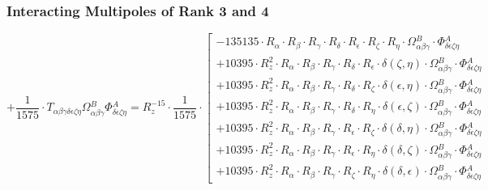 \documentclass{article}
\begin{document}
\subsubsection*{Interacting Multipoles of Rank 3 and 4}
\begin{equation}
+ \frac{1}{1575} \cdot T_{\alpha{}\beta{}\gamma{}\delta{}\epsilon{}\zeta{}\eta{}} \Omega{}^{B}_{\alpha{}\beta{}\gamma{}} \Phi{}^{A}_{\delta{}\epsilon{}\zeta{}\eta{}} = R_{z}^{-15} \cdot \frac{1}{1575} \cdot  \left[ \begin{array}{c} 
 		- 135135 \cdot R_{\alpha{}} \cdot R_{\beta{}} \cdot R_{\gamma{}} \cdot R_{\delta{}} \cdot R_{\epsilon{}} \cdot R_{\zeta{}} \cdot R_{\eta{}} \cdot \Omega{}^{B}_{\alpha{}\beta{}\gamma{}} \cdot \Phi{}^{A}_{\delta{}\epsilon{}\zeta{}\eta{}} 
 \\[0.2em] 		 + 10395 \cdot R_{z}^{2} \cdot R_{\alpha{}} \cdot R_{\beta{}} \cdot R_{\gamma{}} \cdot R_{\delta{}} \cdot R_{\epsilon{}} \cdot \delta{}\left(\zeta{}, \eta{}\right) \cdot \Omega{}^{B}_{\alpha{}\beta{}\gamma{}} \cdot \Phi{}^{A}_{\delta{}\epsilon{}\zeta{}\eta{}} 
 \\[0.2em] 		 + 10395 \cdot R_{z}^{2} \cdot R_{\alpha{}} \cdot R_{\beta{}} \cdot R_{\gamma{}} \cdot R_{\delta{}} \cdot R_{\zeta{}} \cdot \delta{}\left(\epsilon{}, \eta{}\right) \cdot \Omega{}^{B}_{\alpha{}\beta{}\gamma{}} \cdot \Phi{}^{A}_{\delta{}\epsilon{}\zeta{}\eta{}} 
 \\[0.2em] 		 + 10395 \cdot R_{z}^{2} \cdot R_{\alpha{}} \cdot R_{\beta{}} \cdot R_{\gamma{}} \cdot R_{\delta{}} \cdot R_{\eta{}} \cdot \delta{}\left(\epsilon{}, \zeta{}\right) \cdot \Omega{}^{B}_{\alpha{}\beta{}\gamma{}} \cdot \Phi{}^{A}_{\delta{}\epsilon{}\zeta{}\eta{}} 
 \\[0.2em] 		 + 10395 \cdot R_{z}^{2} \cdot R_{\alpha{}} \cdot R_{\beta{}} \cdot R_{\gamma{}} \cdot R_{\epsilon{}} \cdot R_{\zeta{}} \cdot \delta{}\left(\delta{}, \eta{}\right) \cdot \Omega{}^{B}_{\alpha{}\beta{}\gamma{}} \cdot \Phi{}^{A}_{\delta{}\epsilon{}\zeta{}\eta{}} 
 \\[0.2em] 		 + 10395 \cdot R_{z}^{2} \cdot R_{\alpha{}} \cdot R_{\beta{}} \cdot R_{\gamma{}} \cdot R_{\epsilon{}} \cdot R_{\eta{}} \cdot \delta{}\left(\delta{}, \zeta{}\right) \cdot \Omega{}^{B}_{\alpha{}\beta{}\gamma{}} \cdot \Phi{}^{A}_{\delta{}\epsilon{}\zeta{}\eta{}} 
 \\[0.2em] 		 + 10395 \cdot R_{z}^{2} \cdot R_{\alpha{}} \cdot R_{\beta{}} \cdot R_{\gamma{}} \cdot R_{\zeta{}} \cdot R_{\eta{}} \cdot \delta{}\left(\delta{}, \epsilon{}\right) \cdot \Omega{}^{B}_{\alpha{}\beta{}\gamma{}} \cdot \Phi{}^{A}_{\delta{}\epsilon{}\zeta{}\eta{}} 

\end{array}
\end{equation}
\end{document}
